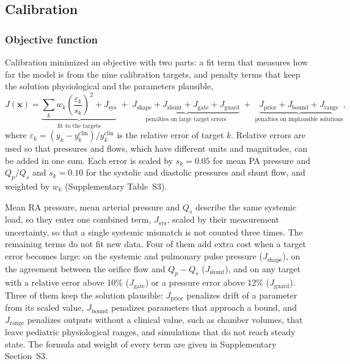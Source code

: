 \FloatBarrier
\subsection{Calibration}
\label{sec:calibration}

\subsubsection{Objective function}
Calibration minimized an objective with two parts: a fit term that measures how far the model is from the nine calibration targets, and penalty terms that keep the solution physiological and the parameters plausible,
\begin{equation}
J(\mathbf{x}) = \underbrace{\sum_{k} w_k\left(\frac{\varepsilon_k}{s_k}\right)^{2} + J_{\mathrm{sys}}}_{\text{fit to the targets}}
\; + \; \underbrace{J_{\mathrm{shape}} + J_{\mathrm{shunt}} + J_{\mathrm{gate}} + J_{\mathrm{guard}}}_{\text{penalties on large target errors}}
\; + \; \underbrace{J_{\mathrm{prior}} + J_{\mathrm{bound}} + J_{\mathrm{range}}}_{\text{penalties on implausible solutions}},
\label{eq:objective}
\end{equation}
where $\varepsilon_k = (y_k - y_k^{\mathrm{clin}})/y_k^{\mathrm{clin}}$ is the relative error of target $k$. Relative errors are used so that pressures and flows, which have different units and magnitudes, can be added in one sum. Each error is scaled by $s_k = 0.05$ for mean PA pressure and $Q_p/Q_s$ and $s_k = 0.10$ for the systolic and diastolic pressures and shunt flow, and weighted by $w_k$ (Supplementary Table~S3).

Mean RA pressure, mean arterial pressure and $Q_s$ describe the same systemic load, so they enter one combined term, $J_{\mathrm{sys}}$, scaled by their measurement uncertainty, so that a single systemic mismatch is not counted three times. The remaining terms do not fit new data. Four of them add extra cost when a target error becomes large: on the systemic and pulmonary pulse pressure ($J_{\mathrm{shape}}$), on the agreement between the orifice flow and $Q_p - Q_s$ ($J_{\mathrm{shunt}}$), and on any target with a relative error above 10\% ($J_{\mathrm{gate}}$) or a pressure error above 12\% ($J_{\mathrm{guard}}$). Three of them keep the solution plausible: $J_{\mathrm{prior}}$ penalizes drift of a parameter from its scaled value, $J_{\mathrm{bound}}$ penalizes parameters that approach a bound, and $J_{\mathrm{range}}$ penalizes outputs without a clinical value, such as chamber volumes, that leave pediatric physiological ranges, and simulations that do not reach steady state. The formula and weight of every term are given in Supplementary Section~S3.

